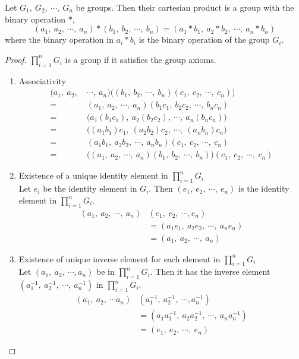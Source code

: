 \begin{theorem}
	Let $G_1,\ G_2,\ \cdots,\ G_n$ be groups.
	Then their cartesian product is a group with the binary operation $\ast$,
	\begin{equation}
		(a_1,\ a_2,\ \cdots,\ a_n) \ast (b_1,\ b_2,\ \cdots,\ b_n) = (a_1 \ast b_1,\ a_2 \ast b_2,\ \cdots,\ a_n \ast b_n)
	\end{equation}
	where the binary operation in  $a_i \ast b_i$ is the binary operation of the group $G_i$.
\end{theorem}
\begin{proof}
	$\prod\limits_{i = 1}^n G_i$ is a group if it satisfies the group axioms.
	\begin{enumerate}[label=G\arabic*]
		\item Associativity
			\begin{align*}
				(a_1,\ a_2,\ & \cdots,\ a_n) \big( (b_1,\ b_2,\ \cdots,\ b_n)(c_1,\ c_2,\ \cdots,\ c_n) \big) \\
				= & (a_1,\ a_2,\ \cdots,\ a_n)(b_1c_1,\ b_2c_2,\ \cdots,\ b_nc_n) \\
				= & \big( a_1(b_1c_1),\ a_2(b_2c_2),\ \cdots,\ a_n(b_nc_n) \big) \\
				= & \big( (a_1 b_1)c_1,\ (a_2b_2)c_2,\ \cdots,\ (a_nb_n )c_n \big) \\
				= &  (a_1b_1,\ a_2b_2,\ \cdots,\ a_nb_n)(c_1,\ c_2,\ \cdots,\ c_n) \\
				= & \big( (a_1,\ a_2,\ \cdots,\ a_n)(b_1,\ b_2,\ \cdots,\ b_n) \big)(c_1,\ c_2,\ \cdots,\ c_n)
			\end{align*}
		\item Existence of a unique identity element in $\prod\limits_{i = 1}^n G_i$\\
			Let $e_i$ be the identity element in $G_i$.
			Then $(e_1,\ e_2,\ \cdots,\ e_n)$ is the identity element in $\prod\limits_{i = 1}^n G_i$.
			\begin{align*}
				(a_1,\ a_2,\ \cdots,\ a_n)&(e_1,\ e_2,\ \cdots, e_n) \\
				& = (a_1e_1,\ a_2e_2,\ \cdots,\ a_ne_n) \\
				& = (a_1,\ a_2,\ \cdots,\ a_n)
			\end{align*}
		\item Existence of unique inverse element for each element in $\prod\limits_{i = 1}^n G_i$\\
			Let $(a_1,\ a_2,\ \cdots, a_n)$ be in $\prod\limits_{i = 1}^n G_i$.
			Then it has the inverse element $( a_1^{-1},\ a_2^{-1},\ \cdots,\ a_n^{-1} )$ in $\prod\limits_{i = 1}^n G_i$.
			\begin{align*}
				(a_1,\ a_2,\ \cdots a_n)&(a_1^{-1},\ a_2^{-1},\ \cdots, a_n^{-1}) \\
				& = (a_1a_1^{-1},\ a_2a_2^{-1},\ \cdots,\ a_na_n^{-1}) \\
				& = (e_1,\ e_2,\ \cdots,\ e_n)
			\end{align*}
	\end{enumerate}
\end{proof}

